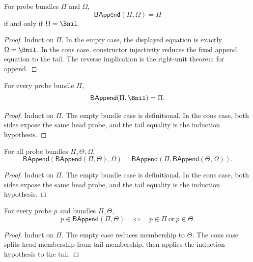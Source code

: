 \begin{theorem}
\label{thm:bundle-append-eq-left-iff-right-nil}
For probe bundles $\Pi$ and $\Omega$,
$$
\mathsf{BAppend}(\Pi,\Omega)=\Pi
$$
if and only if $\Omega=\Bnil$.
\end{theorem}
\begin{proof}
Induct on $\Pi$. In the empty case, the displayed equation is exactly
$\Omega=\Bnil$. In the cons case, constructor injectivity reduces the fixed
append equation to the tail. The reverse implication is the right-unit theorem
for append.
\end{proof}

\begin{theorem}
\label{thm:bundle-append-right-unit}
For every probe bundle \(\Pi\),
$$
\mathsf{BAppend}(\Pi,\Bnil)=\Pi .
$$
\end{theorem}
\begin{proof}
Induct on \(\Pi\). The empty bundle case is definitional. In the cons case,
both sides expose the same head probe, and the tail equality is the induction
hypothesis.
\end{proof}

\begin{theorem}
\label{thm:probe-bundle-append-associativity}
For all probe bundles \(\Pi,\Theta,\Omega\),
$$
\mathsf{BAppend}(\mathsf{BAppend}(\Pi,\Theta),\Omega)
=
\mathsf{BAppend}(\Pi,\mathsf{BAppend}(\Theta,\Omega)).
$$
\end{theorem}
\begin{proof}
Induct on \(\Pi\). The empty bundle case is definitional. In the cons case,
both sides expose the same head probe, and the tail equality is the induction
hypothesis.
\end{proof}

\begin{theorem}
\label{thm:bundle-append-membership}
For every probe $p$ and bundles $\Pi,\Theta$,
$$
p\in\mathsf{BAppend}(\Pi,\Theta)
\quad\Longleftrightarrow\quad
p\in\Pi \ \text{or}\ p\in\Theta .
$$
\end{theorem}
\begin{proof}
Induct on $\Pi$. The empty case reduces membership to $\Theta$. The cons case splits head
membership from tail membership, then applies the induction hypothesis to the tail.
\end{proof}

